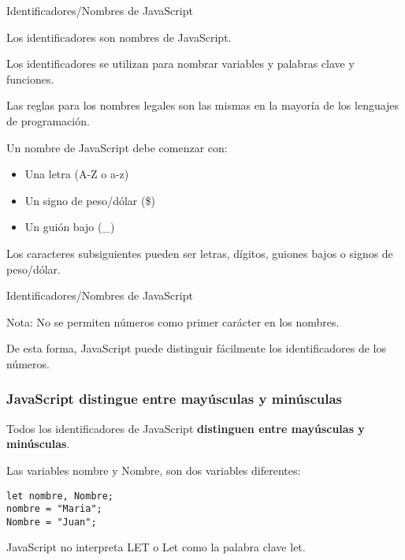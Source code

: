 \begin{frame}[c]{Identificadores/Nombres de JavaScript}

  Los identificadores son nombres de JavaScript.

  \vspace{\baselineskip}
  Los identificadores se utilizan para nombrar variables y
  palabras clave y funciones.

  \vspace{\baselineskip}
  Las reglas para los nombres legales son las mismas en la
  mayoría de los lenguajes de programación.

  \vspace{\baselineskip}
  Un nombre de JavaScript debe comenzar con:

  \begin{itemize}
    \item Una letra (A-Z o a-z)
    \item Un signo de peso/dólar (\$)
    \item Un guión bajo (\_)
  \end{itemize}

  \vspace{\baselineskip}
  Los caracteres subsiguientes pueden ser letras, dígitos,
  guiones bajos o signos de peso/dólar.
\end{frame}

\begin{frame}[c]{Identificadores/Nombres de JavaScript}
  \begin{alertblock}{Nota:}
    No se permiten números como primer carácter en los nombres.

    \vspace{\baselineskip}
    De esta forma, JavaScript puede distinguir fácilmente los identificadores de los números.
  \end{alertblock}
\end{frame}

\begin{frame}[fragile]
  \frametitle{JavaScript distingue entre mayúsculas y minúsculas}

  Todos los identificadores de JavaScript \textbf{distinguen
  entre mayúsculas y minúsculas}.

  \vspace{\baselineskip}
  Las variables nombre y Nombre, son dos variables diferentes:

  \vspace{\baselineskip}
  \begin{lstlisting}
let nombre, Nombre;
nombre = "Maria";
Nombre = "Juan";
  \end{lstlisting}

  \vspace{\baselineskip}
  JavaScript no interpreta LET o Let como la palabra clave let.
\end{frame}

